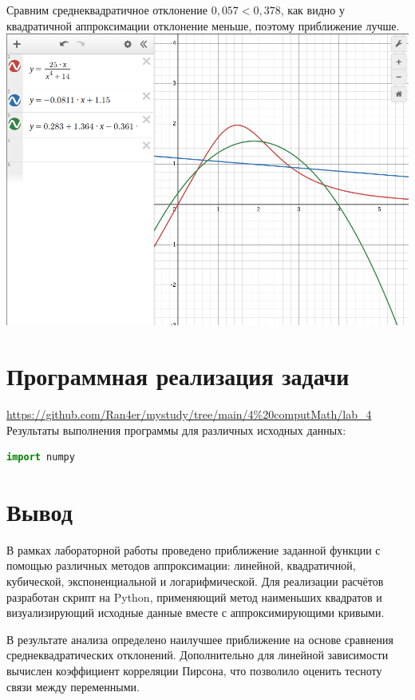 \documentclass[12pt]{article}
\begin{document}
Сравним среднеквадратичное отклонение $0,057 < 0,378$, как видно у квадратичной аппроксимации отклонение меньше, поэтому приближение лучше.\\
\vspace{5mm}
\centering
\includegraphics[scale=0.6]{approx_and_function.png}\\
\raggedright
\vspace{5mm}
\section{Программная реализация задачи}
\vspace{5mm}
\url{https://github.com/Ran4er/mystudy/tree/main/4%20computMath/lab_4}\\
\vspace{5mm}
Результаты выполнения программы для различных исходных данных:\\
\begin{lstlisting}[language=Python]
import numpy
\end{lstlisting}
\vspace{5mm}
\section*{Вывод}
В рамках лабораторной работы проведено приближение заданной функции с помощью различных методов аппроксимации: линейной, квадратичной, кубической, экспоненциальной и логарифмической. Для реализации расчётов разработан скрипт на Python, применяющий метод наименьших квадратов и визуализирующий исходные данные вместе с аппроксимирующими кривыми.

В результате анализа определено наилучшее приближение на основе сравнения среднеквадратических отклонений. Дополнительно для линейной зависимости вычислен коэффициент корреляции Пирсона, что позволило оценить тесноту связи между переменными.
\end{document}
